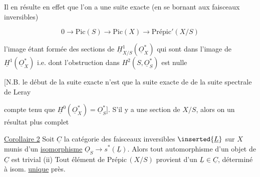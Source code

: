 



Il en résulte en effet que l'on a une suite exacte (en se bornant aux faisceaux inversibles)

\[
0\longrightarrow\mathrm{Pic}(S)\longrightarrow\mathrm{Pic}(X)\longrightarrow\mathrm{Prépic}'(X/S)
\]


l'image étant formée des sections de $\underline H^1_{X/S}(\underline O_X^*)$ qui sont dans l'image de $\underline H^1(\underline O_X^*)$ i.e. dont l'obstruction dans $H^2(S,\underline O_S^*)$ est nulle

[N.B. le début de la suite exacte n'est que la suite exacte de  de la suite spectrale de Leray


compte tenu que $\underline H^0(\underline O_X^*)=\underline O_S^*$]. S'il y a une section  de $X/S$, alors on   un résultat plus complet


\uline{Corollaire 2} Soit $\underline C$ la catégorie des faisceaux inversibles $\inserted{\underline L}$ sur $X$ munis d'un \uline{isomorphisme} $\underline O_S\longrightarrow s^*(\underline L)$. Alors  tout automorphisme d'un objet de $\underline C$ est trivial (ii) Tout  élément de $\mathrm{Prépic}\,(X/S)$ provient d'un $\underline L\in\underline C$, déterminé à isom. \uline{unique} près.

